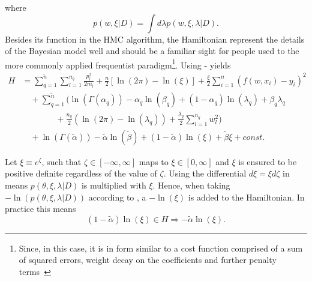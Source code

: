 where 
\begin{equation}
	p(w,\xi|D) = \int d\lambda p(w,\xi,\lambda|D).
	\label{eq:ss}
\end{equation}
Besides its function in the HMC algorithm, the Hamiltonian represent the details of the Bayesian model well and should be a familiar sight for people used to the more commonly applied frequentist paradigm\footnote{Since, in this case, it is in form similar to a cost function comprised of a sum of squared errors, weight decay on the coefficients and further penalty terms~\citep{hastie_09,murphy2013machine,Goodfellow2016}}. Using - yields
\begin{equation}
	\begin{split}
		H&=\sum_{q=1}^{\tilde{n}}\sum_{l=1}^{n_q}\frac{p_{l}^2}{2m_{l}}+\frac{n}{2}[\ln(2\pi)-\ln(\xi)] +\frac{\xi}{2}\sum_{i=1}^{n}(f(w,x_i)-y_i)^2\\
		&\quad+\sum_{q=1}^{\tilde{n}}\bigg(\ln(\Gamma(\alpha_q))-\alpha_q\ln(\beta_q)+(1-\alpha_q)\ln(\lambda_q)+\beta_q\lambda_q\\
		&\qquad\qquad+\frac{n_q}{2}(\ln(2\pi)-\ln(\lambda_q))+\frac{\lambda_q}{2}\sum_{l=1}^{n_q}w_l^2\bigg)\\
		&\quad+\ln(\Gamma(\tilde{\alpha}))-\tilde{\alpha}\ln(\tilde{\beta})+(1-\tilde{\alpha})\ln(\xi)+\tilde{\beta}\xi+const.
	\end{split}
	\label{eqh2}
\end{equation}


\begin{example}
	Let $\xi \equiv e^\zeta$, such that $\zeta\in [-\infty,\infty]$ maps to $\xi\in[0,\infty]$ and $\xi$ is ensured to be positive definite regardless of the value of $\zeta$. Using the differential $d\xi =  \xi d\zeta$ in  means $p(\theta,\xi,\lambda|D)$ is multiplied with $\xi$. Hence, when taking $-\ln(p(\theta,\xi,\lambda|D))$ according to , a $-\ln(\xi)$ is added to the Hamiltonian. In practice this means
	\begin{equation}
		(1-\tilde{\alpha})\ln(\xi)\in H\Rightarrow -\tilde{\alpha}\ln(\xi).
	\end{equation} 	
\end{example}

